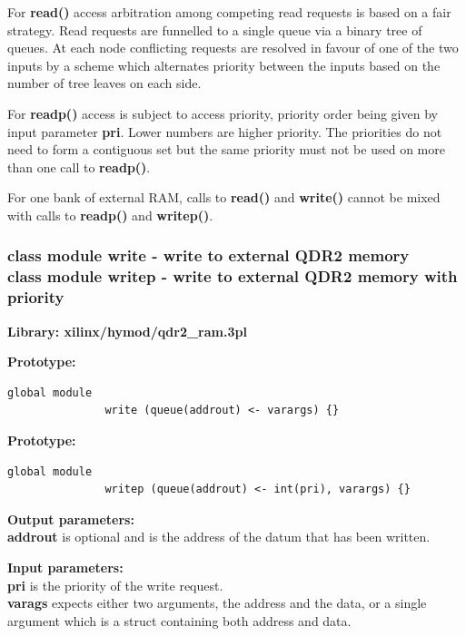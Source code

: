             For {\bf read()} access arbitration among competing read
            requests is based on a fair strategy. Read requests are funnelled to
            a single queue via a binary tree of queues. At each node conflicting
            requests are resolved in favour of one of the two inputs by a scheme
            which alternates priority between the inputs based on the number of
            tree leaves on each side.
            
            For {\bf readp()} access is subject to access priority, priority
            order being given by input parameter {\bf pri}. Lower numbers are
            higher priority. The priorities do not need to form a contiguous
            set but the same priority must not be used on more than one call
            to {\bf readp()}.
            
            For one bank of external RAM, calls to {\bf read()} and {\bf
            write()} cannot be mixed with calls to {\bf readp()} and
            {\bf writep()}.


        \subsubsection{class module write - write to external QDR2 memory\\
                       class module writep - write to external QDR2 memory with priority}\label{sec:lcqdr2ramwrite}

            {\bf Library: xilinx/hymod/qdr2\_ram.3pl}

            {\bf Prototype:} \\
            \vsp
            \begin{lstlisting}[gobble=12, language=threepl]
               global module
               write (queue(addrout) <- varargs) {}
            \end{lstlisting}
            {\bf Prototype:} \\
            \vsp
            \begin{lstlisting}[gobble=12, language=threepl]
               global module
               writep (queue(addrout) <- int(pri), varargs) {}
            \end{lstlisting}

            {\bf Output parameters:} \\
            {\bf addrout} is optional and is the address of the datum that
            has been written.

            {\bf Input parameters:} \\
            {\bf pri} is the priority of the write request. \\
            {\bf varags} expects either two arguments, the address and the data,
            or a single argument which is a struct containing both address and
            data.

